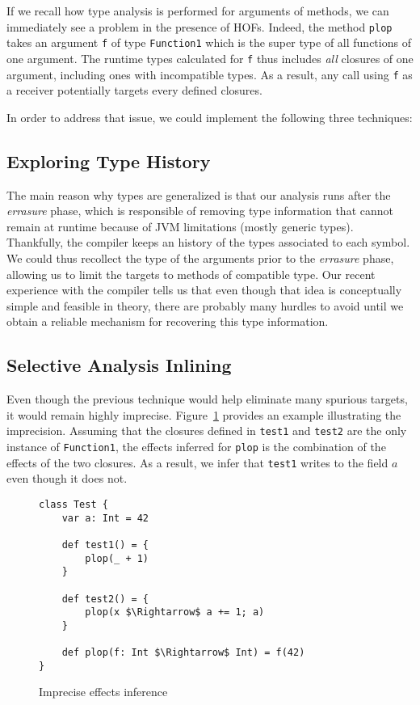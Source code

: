 If we recall how type analysis is performed for arguments of methods, we can
immediately see a problem in the presence of HOFs. Indeed, the method
\lstinline{plop} takes an argument \lstinline{f} of type \lstinline{Function1}
which is the super type of all functions of one argument. The runtime types
calculated for \lstinline{f} thus includes \emph{all} closures of one argument,
including ones with incompatible types. As a result, any call using
\lstinline{f} as a receiver potentially targets every defined closures.

In order to address that issue, we could implement the following three
techniques:

\subsection{Exploring Type History}
The main reason why types are generalized is that our analysis runs after the
\emph{errasure} phase, which is responsible of removing type information that
cannot remain at runtime because of JVM limitations (mostly generic types).
Thankfully, the compiler keeps an history of the types associated to each
symbol. We could thus recollect the type of the arguments prior to the
\emph{errasure} phase, allowing us to limit the targets to methods of
compatible type. Our recent experience with the compiler tells us that even
though that idea is conceptually simple and feasible in theory, there are
probably many hurdles to avoid until we obtain a reliable mechanism for
recovering this type information.

\subsection{Selective Analysis Inlining}
Even though the previous technique would help eliminate many spurious targets,
it would remain highly imprecise. Figure~\ref{fig:con:inl} provides an example
illustrating the imprecision. Assuming that the closures defined in
\lstinline{test1} and \lstinline{test2} are the only instance of
\lstinline{Function1}, the effects inferred for \lstinline{plop} is the
combination of the effects of the two closures. As a result, we infer that
\lstinline{test1} writes to the field $a$ even though it does not.

\begin{figure}[h]
    \centering
\begin{lstlisting}
class Test {
    var a: Int = 42

    def test1() = {
        plop(_ + 1)
    }

    def test2() = {
        plop(x $\Rightarrow$ a += 1; a)
    }

    def plop(f: Int $\Rightarrow$ Int) = f(42)
}
\end{lstlisting}
    \caption{Imprecise effects inference}
    \label{fig:con:inl}
\end{figure}

